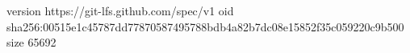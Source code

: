 version https://git-lfs.github.com/spec/v1
oid sha256:00515e1c45787dd77870587495788bdb4a82b7dc08e15852f35c059220c9b500
size 65692
